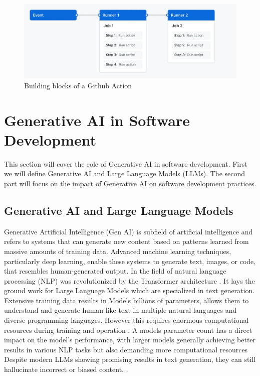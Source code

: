 \begin{figure}[H]
    \centering
    \includegraphics[width=1\textwidth]{images/overview-actions-simple.png}
    \caption{Building blocks of a Github Action}
    \label{fig:gh-workflow}
\end{figure}

\section{Generative AI in Software Development}

This section will cover the role of Generative AI in software development. First we will define Generative AI and Large Language Models (LLMs). The second part will focus on the impact of Generative AI on software development practices.
\subsection{Generative AI and Large Language Models}
Generative Artificial Intelligence (Gen AI) is subfield of artificial intelligence and refers to systems that can generate new content based on patterns learned from massive amounts of training data. Advanced machine learning techniques, particularly deep learning, enable these systems to generate text, images, or code, that resembles human-generated output.
In the field of natural language processing (NLP) was revolutionized by the Transformer architecture \cite{changSurveyEvaluationLarge2024}. It lays the ground work for Large Language Models which are specialized in text generation. Extensive training data results in Models billions of parameters, allows them to understand and generate human-like text in multiple natural languages and diverse programming languages. However this requires enormous computational resources during training and operation \cite{LLMsWhatsLarge}. A models parameter count has a direct impact on the model's performance, with larger models generally achieving better results in various NLP tasks but also demanding more computational resources %
Despite modern LLMs showing promising results in text generation, they can still hallucinate incorrect or biased content. \cite{LLMsWhatsLarge}.

